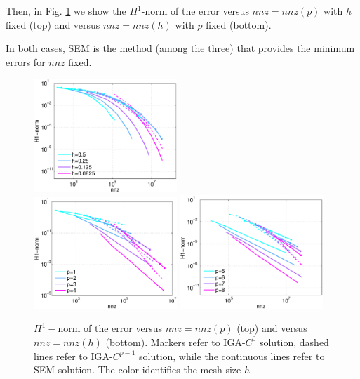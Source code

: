 \documentclass[11pt]{article}
\begin{document}
Then, in Fig. \ref{fig:errori_H1L2_nnz} we show the $H^1$-norm 
of the error versus $nnz=nnz(p)$ with $h$ fixed (top) 
and  versus $nnz=nnz(h)$ with $p$ fixed (bottom).


In both cases, SEM is 
the method (among the three) that provides the minimum errors
for  $nnz$ fixed.


\begin{figure}
\begin{center}
\includegraphics[width=0.48\textwidth]{Images/errnnzH1_3d_p.eps}\\
\includegraphics[width=0.48\textwidth]{Images/errnnzH1_3d_ha.eps}
\includegraphics[width=0.48\textwidth]{Images/errnnzH1_3d_hb.eps}
\end{center}
\caption{$H^1-$norm of the error versus
$nnz=nnz(p)$ (top) and versus
$nnz=nnz(h)$ (bottom).
Markers refer to IGA-$C^0$ solution, dashed lines refer to IGA-$C^{p-1}$
solution, while the continuous lines refer to SEM solution.
The color identifies the
mesh size $h$}
\label{fig:errori_H1L2_nnz}
\end{figure}
\end{document}
